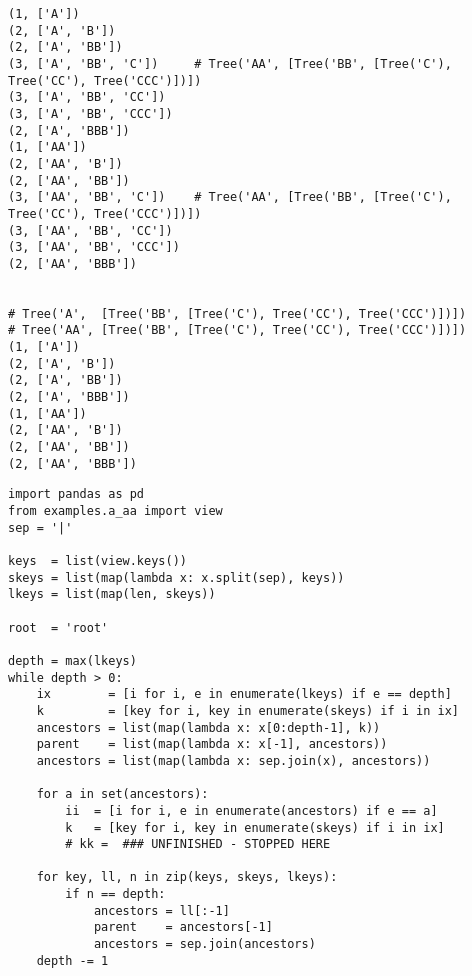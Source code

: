\documentclass[10pt]{amsart}
\numberwithin{equation}{section}
\begin{document}
\begin{verbatim}
(1, ['A'])
(2, ['A', 'B'])
(2, ['A', 'BB'])
(3, ['A', 'BB', 'C'])     # Tree('AA', [Tree('BB', [Tree('C'), Tree('CC'), Tree('CCC')])])
(3, ['A', 'BB', 'CC'])
(3, ['A', 'BB', 'CCC'])
(2, ['A', 'BBB'])
(1, ['AA'])
(2, ['AA', 'B'])
(2, ['AA', 'BB'])
(3, ['AA', 'BB', 'C'])    # Tree('AA', [Tree('BB', [Tree('C'), Tree('CC'), Tree('CCC')])])
(3, ['AA', 'BB', 'CC'])
(3, ['AA', 'BB', 'CCC'])
(2, ['AA', 'BBB'])


# Tree('A',  [Tree('BB', [Tree('C'), Tree('CC'), Tree('CCC')])])
# Tree('AA', [Tree('BB', [Tree('C'), Tree('CC'), Tree('CCC')])])
(1, ['A'])
(2, ['A', 'B'])
(2, ['A', 'BB'])
(2, ['A', 'BBB'])
(1, ['AA'])
(2, ['AA', 'B'])
(2, ['AA', 'BB'])
(2, ['AA', 'BBB'])

\end{verbatim}

\begin{verbatim}
import pandas as pd
from examples.a_aa import view
sep = '|'

keys  = list(view.keys())
skeys = list(map(lambda x: x.split(sep), keys))
lkeys = list(map(len, skeys))

root  = 'root'

depth = max(lkeys)
while depth > 0:
    ix        = [i for i, e in enumerate(lkeys) if e == depth]
    k         = [key for i, key in enumerate(skeys) if i in ix]
    ancestors = list(map(lambda x: x[0:depth-1], k))
    parent    = list(map(lambda x: x[-1], ancestors))
    ancestors = list(map(lambda x: sep.join(x), ancestors))

    for a in set(ancestors):
        ii  = [i for i, e in enumerate(ancestors) if e == a]
        k   = [key for i, key in enumerate(skeys) if i in ix]
        # kk =  ### UNFINISHED - STOPPED HERE

    for key, ll, n in zip(keys, skeys, lkeys):
        if n == depth:
            ancestors = ll[:-1]
            parent    = ancestors[-1]
            ancestors = sep.join(ancestors)
    depth -= 1

\end{verbatim}
\end{document}
